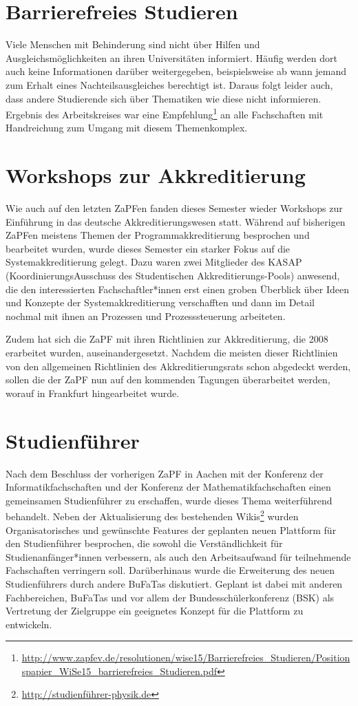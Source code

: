 \section*{Barrierefreies Studieren}
Viele Menschen mit Behinderung sind nicht über Hilfen und
Ausgleichsmöglichkeiten an ihren Universitäten informiert. Häufig werden dort
auch keine Informationen darüber weitergegeben, beispielsweise ab wann jemand
zum Erhalt eines Nachteilsausgleiches berechtigt ist. Daraus folgt leider auch,
dass andere Studierende sich über Thematiken wie diese nicht informieren.  Ergebnis des
Arbeitskreises war eine
Empfehlung\footnote{\href{http://www.zapfev.de/resolutionen/wise15/Barrierefreies\_Studieren/Positionspapier\_WiSe15\_barrierefreies\_Studieren.pdf}{\url{http://www.zapfev.de/resolutionen/wise15/Barrierefreies\_Studieren/Positionspapier\_WiSe15\_barrierefreies\_Studieren.pdf}}}
an alle Fachschaften mit Handreichung zum Umgang mit diesem Themenkomplex.

\section*{Workshops zur Akkreditierung} Wie auch auf den letzten ZaPFen fanden
dieses Semester wieder Workshops zur Einführung in das deutsche
Akkreditierungswesen statt. Während auf bisherigen ZaPFen meistens Themen der
Programmakkreditierung besprochen und bearbeitet wurden, wurde dieses Semester
ein starker Fokus auf die Systemakkreditierung gelegt. Dazu waren zwei
Mitglieder des KASAP (KoordinierungsAusschuss des Studentischen
Akkreditierungs-Pools) anwesend, die den interessierten Fachschaftler*innen erst einen groben Überblick über Ideen und Konzepte der
Systemakkreditierung verschafften und dann im Detail nochmal mit ihnen an
Prozessen und Prozesssteuerung arbeiteten.

Zudem hat sich die ZaPF mit ihren Richtlinien zur Akkreditierung, die 2008
erarbeitet wurden, auseinandergesetzt. Nachdem die meisten dieser Richtlinien
von den allgemeinen Richtlinien des Akkreditierungsrats schon abgedeckt werden,
sollen die der ZaPF nun auf den kommenden Tagungen überarbeitet werden, worauf
in Frankfurt hingearbeitet wurde.

\section*{Studienführer}
Nach dem Beschluss der vorherigen ZaPF in Aachen mit der Konferenz der
Informatikfachschaften und der Konferenz der Mathematikfachschaften einen
gemeinsamen Studienführer zu  erschaffen, wurde dieses Thema weiterführend
behandelt. Neben der Aktualisierung des bestehenden
Wikis\footnote{\url{http://studienführer-physik.de}} wurden Organisatorisches
und gewünschte Features der geplanten neuen Plattform für den Studienführer
besprochen, die sowohl die Verständlichkeit für Studienanfänger*innen verbessern, als
auch den Arbeitsaufwand für teilnehmende Fachschaften verringern soll.
Darüberhinaus wurde die Erweiterung des neuen Studienführers durch andere
BuFaTas diskutiert. Geplant ist dabei  mit anderen Fachbereichen, BuFaTas und
vor allem der Bundesschülerkonferenz (BSK) als Vertretung der Zielgruppe ein
geeignetes Konzept für die Plattform zu entwickeln.

